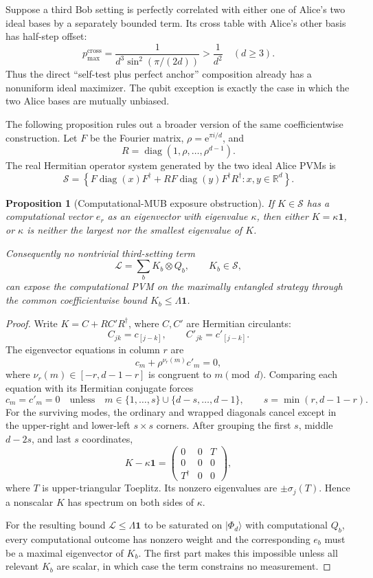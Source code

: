 \documentclass[11pt]{article}
\newtheorem{proposition}[theorem]{Proposition}
\theoremstyle{remark}
\newcommand{\Id}{\mathbf 1}
\newcommand{\cS}{\mathcal S}
\newcommand{\e}{\mathrm e}
\begin{document}
Suppose a third Bob setting is perfectly correlated with either one of
Alice's two ideal bases by a separately bounded term.  Its cross table with
Alice's other basis has half-step offset:
\[
p_{\max}^{\mathrm{cross}}
=
\frac1{d^3\sin^2(\pi/(2d))}
>\frac1{d^2}
\quad(d\geq3).
\]
Thus the direct ``self-test plus perfect anchor'' composition already has a
nonuniform ideal maximizer.  The qubit exception is exactly the case in
which the two Alice bases are mutually unbiased.

The following proposition rules out a broader version of the same
coefficientwise construction.  Let \(F\) be the Fourier matrix,
\(\rho=\e^{\pi i/d}\), and
\[
R=\operatorname{diag}(1,\rho,\ldots,\rho^{d-1}).
\]
The real Hermitian operator system generated by the two ideal Alice PVMs is
\[
\cS
=
\left\{
F\operatorname{diag}(x)F^\dagger
+RF\operatorname{diag}(y)F^\dagger R^\dagger:
x,y\in\mathbb R^d
\right\}.
\]

\begin{proposition}[Computational-MUB exposure obstruction]
\label{prop:mub-obstruction}
If \(K\in\cS\) has a computational vector \(e_r\) as an eigenvector with
eigenvalue \(\kappa\), then either \(K=\kappa\Id\), or \(\kappa\) is neither
the largest nor the smallest eigenvalue of \(K\).

Consequently no nontrivial third-setting term
\[
\mathcal L=\sum_bK_b\otimes Q_b,\qquad K_b\in\cS,
\]
can expose the computational PVM on the maximally entangled strategy through
the common coefficientwise bound \(K_b\leq\Lambda\Id\).
\end{proposition}

\begin{proof}
Write \(K=C+RC'R^\dagger\), where \(C,C'\) are Hermitian circulants:
\[
C_{jk}=c_{[j-k]},\qquad C'_{jk}=c'_{[j-k]}.
\]
The eigenvector equations in column \(r\) are
\[
c_m+\rho^{\nu_r(m)}c'_m=0,
\]
where \(\nu_r(m)\in[-r,d-1-r]\) is congruent to \(m\pmod d\).
Comparing each equation with its Hermitian conjugate forces
\[
c_m=c'_m=0
\quad\text{unless}\quad
m\in\{1,\ldots,s\}\cup\{d-s,\ldots,d-1\},
\qquad
s=\min(r,d-1-r).
\]
For the surviving modes, the ordinary and wrapped diagonals cancel except
in the upper-right and lower-left \(s\times s\) corners.  After grouping the
first \(s\), middle \(d-2s\), and last \(s\) coordinates,
\[
K-\kappa\Id
=
\begin{pmatrix}
0&0&T\\
0&0&0\\
T^\dagger&0&0
\end{pmatrix},
\]
where \(T\) is upper-triangular Toeplitz.  Its nonzero eigenvalues are
\(\pm\sigma_j(T)\).  Hence a nonscalar \(K\) has spectrum on both sides of
\(\kappa\).

For the resulting bound \(\mathcal L\leq\Lambda\Id\) to be saturated on
\(\lvert\Phi_d\rangle\) with computational \(Q_b\), every computational
outcome has nonzero weight and the corresponding \(e_b\) must be a maximal
eigenvector of \(K_b\).  The first part makes this impossible unless all
relevant \(K_b\) are scalar, in which case the term constrains no
measurement.
\end{proof}
\end{document}

